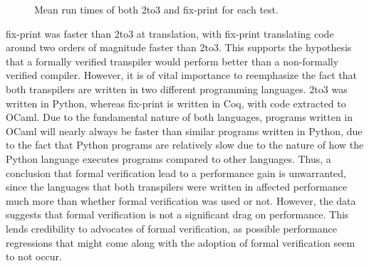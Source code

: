 \begin{figure*}[ht]
    \caption{Mean run times of both 2to3 and fix-print for each test.}
\end{figure*}


fix-print was faster than 2to3 at translation, with fix-print translating code around two orders of magnitude faster than 2to3. This supports the hypothesis that a formally verified transpiler would perform better than a non-formally verified compiler. However, it is of vital importance to reemphasize the fact that both transpilers are written in two different programming languages. 2to3 was written in Python, whereas fix-print is written in Coq, with code extracted to OCaml. Due to the fundamental nature of both languages, programs written in OCaml will nearly always be faster than similar programs written in Python, due to the fact that Python programs are relatively slow due to the nature of how the Python language executes programs compared to other languages. Thus, a conclusion that formal verification lead to a performance gain is unwarranted, since the languages that both transpilers were written in affected performance much more than whether formal verification was used or not. However, the data suggests that formal verification is not a significant drag on performance. This lends credibility to advocates of formal verification, as possible performance regressions that might come along with the adoption of formal verification seem to not occur.

